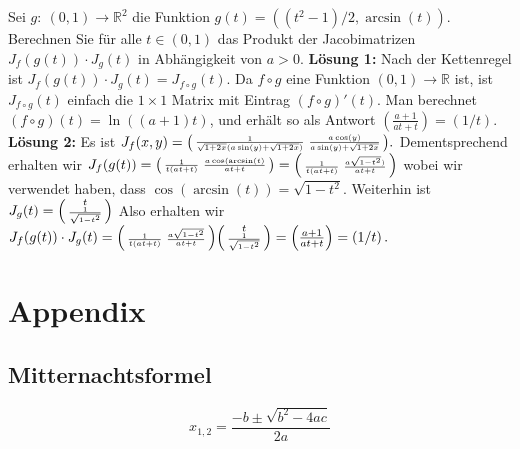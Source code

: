 \documentclass[a4paper,10pt]{article}
\def\R{\mathbb{R}}
\begin{document}
Sei \( g: \: (0, 1) \to \R^2 \) die Funktion \( g(t) = ((t^2 - 1)/2, \arcsin(t)) \). Berechnen Sie für alle \( t \in (0, 1) \) das Produkt der Jacobimatrizen
\(
    J_f(g(t)) \cdot J_g(t)
\)
in Abhängigkeit von \( a > 0 \).
\textbf{Lösung 1:} Nach der Kettenregel ist \( J_f(g(t)) \cdot J_g(t) = J_{f \circ g}(t) \). Da \( f \circ g \) eine Funktion \( (0, 1) \to \R \) ist, ist \( J_{f \circ g}(t) \) einfach die \( 1 \times 1 \) Matrix mit Eintrag \( (f \circ g)'(t) \). Man berechnet \( (f \circ g)(t) = \ln((a + 1) t) \), und erhält so als Antwort
\(
    \left( \frac{a + 1}{at + t} \right) = \left( 1/t \right) \text{.}
\)
\textbf{Lösung 2:} Es ist
\(
    J_f(x, y) = \begin{psmallmatrix} \frac{1}{\sqrt{1 + 2x} (a \sin(y) + \sqrt{1 + 2x})} & \frac{a \cos(y)}{a \sin(y) + \sqrt{1 + 2x}} \end{psmallmatrix} \text{.}
\)
Dementsprechend erhalten wir
\(
    J_f(g(t)) = \begin{psmallmatrix} \frac{1}{t(at + t)} & \frac{a \cos(\arcsin(t)}{at + t} \end{psmallmatrix} = \begin{psmallmatrix} \frac{1}{t(at + t)} & \frac{a \sqrt{1 - t^2})}{at + t} \end{psmallmatrix}
\)
wobei wir verwendet haben, dass \( \cos(\arcsin(t)) = \sqrt{1 - t^2} \).
Weiterhin ist
\(
    J_g(t) = \begin{psmallmatrix} t \\ \frac{1}{\sqrt{1 - t^2}} \end{psmallmatrix}
\)
Also erhalten wir
\(
    J_f(g(t)) \cdot J_g(t) = \begin{psmallmatrix} \frac{1}{t(at + t)} & \frac{a \sqrt{1 - t^2}}{at + t} \end{psmallmatrix} \begin{psmallmatrix} t \\ \frac{1}{\sqrt{1 - t^2}} \end{psmallmatrix} = \left( \frac{a + 1}{at + t} \right) = \left( 1/t \right) \text{.}
\)


\section{Appendix}
\footnotesize

\subsection{Mitternachtsformel}
\[
    x_{1,2} = \frac{-b \pm \sqrt{b^2 - 4ac}}{2a}
\]
\end{document}

